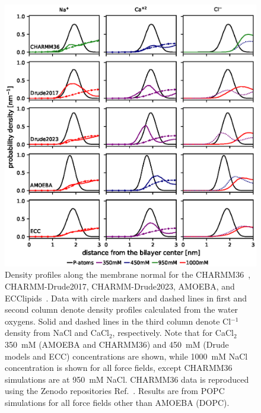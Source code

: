 \documentclass[journal=jctcce,manuscript=article,layout=singlecolumn]{achemso}
\begin{document}
\begin{figure}[!hbt]
    \centering
    \includegraphics{Figures/ion_density_profiles_with_chloride.eps}
    \caption{Density profiles along the membrane normal for the CHARMM36~\cite{Catte2016}, CHARMM-Drude2017, CHARMM-Drude2023, AMOEBA, and ECClipids~\cite{Melcr:2018a}. Data with circle markers and dashed lines in first and second column denote density profiles calculated from the water oxygens. Solid and dashed lines in the third column denote Cl$^{-1}$ density from NaCl and CaCl$_{2}$, respectively. Note that for CaCl$_{2}$ 350~mM (AMOEBA and CHARMM36) and 450~mM (Drude models and ECC) concentrations are shown, while 1000~mM NaCl concentration is shown for all force fields, except CHARMM36 simulations are at 950~mM NaCl. CHARMM36 data is reproduced using the Zenodo repositories Ref.~. Results are from POPC simulations for all force fields other than AMOEBA (DOPC).}
    \label{fig:ion_density_profiles}
\end{figure}
\end{document}
